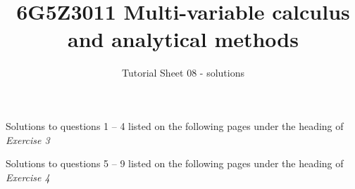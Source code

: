 \documentclass[a4paper]{amsart}
\begin{document}
\title{6G5Z3011 Multi-variable calculus and analytical methods}
\author{Tutorial Sheet 08 - solutions}
\maketitle

Solutions to questions 1 -- 4 listed on the following pages under the heading of \textit{Exercise 3}

Solutions to questions 5 -- 9 listed on the following pages under the heading of \textit{Exercise 4}


\end{document}
